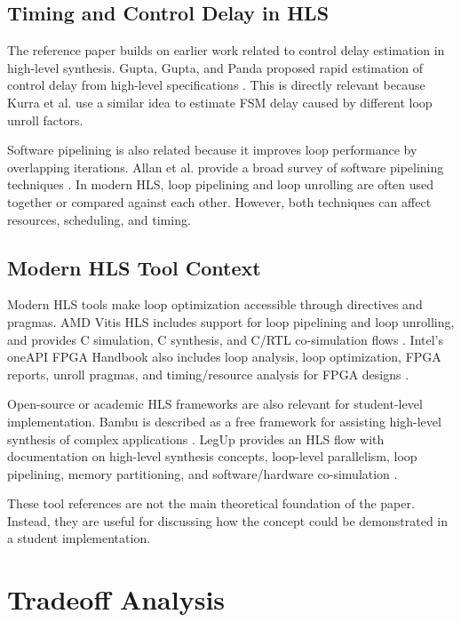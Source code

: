 \documentclass[conference]{IEEEtran}
\begin{document}
\subsection{Timing and Control Delay in HLS}

The reference paper builds on earlier work related to control delay estimation in high-level synthesis. Gupta, Gupta, and Panda proposed rapid estimation of control delay from high-level specifications \cite{gupta2006}. This is directly relevant because Kurra et al. use a similar idea to estimate FSM delay caused by different loop unroll factors.

Software pipelining is also related because it improves loop performance by overlapping iterations. Allan et al. provide a broad survey of software pipelining techniques \cite{allan1995}. In modern HLS, loop pipelining and loop unrolling are often used together or compared against each other. However, both techniques can affect resources, scheduling, and timing.

\subsection{Modern HLS Tool Context}

Modern HLS tools make loop optimization accessible through directives and pragmas. AMD Vitis HLS includes support for loop pipelining and loop unrolling, and provides C simulation, C synthesis, and C/RTL co-simulation flows \cite{vitis2026}. Intel's oneAPI FPGA Handbook also includes loop analysis, loop optimization, FPGA reports, unroll pragmas, and timing/resource analysis for FPGA designs \cite{inteloneapi2024}.

Open-source or academic HLS frameworks are also relevant for student-level implementation. Bambu is described as a free framework for assisting high-level synthesis of complex applications \cite{bambu}. LegUp provides an HLS flow with documentation on high-level synthesis concepts, loop-level parallelism, loop pipelining, memory partitioning, and software/hardware co-simulation \cite{legup2021}.

These tool references are not the main theoretical foundation of the paper. Instead, they are useful for discussing how the concept could be demonstrated in a student implementation.

\section{Tradeoff Analysis}
\end{document}

